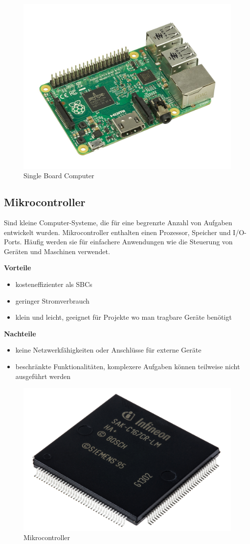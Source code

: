 \begin{figure}[H]
	\centering
	\includegraphics[width=0.7\linewidth]{images/SingleBoard Computer.jpg}
	\caption[Single Board Computer]{Single Board Computer}
	\label{fig:Single Board Computer}
\end{figure}

\newpage
\subsection{Mikrocontroller}
Sind kleine Computer-Systeme, die für eine begrenzte Anzahl von Aufgaben entwickelt wurden. Mikrocontroller enthalten einen Prozessor, Speicher und I/O-Ports. Häufig werden sie für einfachere Anwendungen wie die Steuerung von Geräten und Maschinen verwendet. \parencite{EinzelplatinencomputerVsMikrocontroller}

\textbf{Vorteile}
\begin{itemize}
	\item kosteneffizienter als SBCs
	\item geringer Stromverbrauch
	\item klein und leicht, geeignet für Projekte wo man tragbare Geräte benötigt 
\end{itemize}

\textbf{Nachteile}
\begin{itemize}
	\item keine Netzwerkfähigkeiten oder Anschlüsse für externe Geräte
	\item beschränkte Funktionalitäten, komplexere Aufgaben können teilweise nicht ausgeführt werden
\end{itemize}

\begin{figure}[H]
	\centering
	\includegraphics[width=0.7\linewidth]{images/Mikrocontroller.jpg}
	\caption[Mikrocontroller]{Mikrocontroller}
	\label{fig:Mikrocontroller}
\end{figure}

